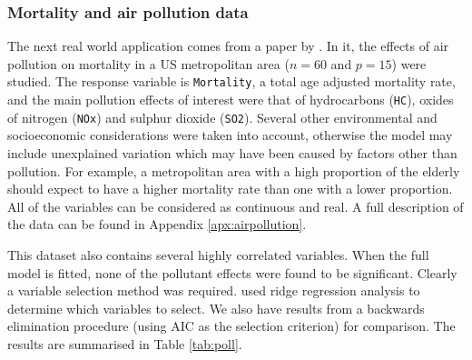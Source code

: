 \subsubsection{Mortality and air pollution data}
\label{sec:airpollution}

The next real world application comes from a paper by \cite{McDonald1973}. In it, the effects of air pollution on mortality in a US metropolitan area ($n=60$ and $p=15$) were studied. The response variable is \texttt{Mortality}, a total age adjusted mortality rate, and the main pollution effects of interest were that of hydrocarbons (\texttt{HC}), oxides of nitrogen (\texttt{NOx}) and sulphur dioxide (\texttt{SO2}). Several other environmental and socioeconomic considerations were taken into account, otherwise the model may include unexplained variation which may have been caused by factors other than pollution. For example, a metropolitan area with a high proportion of the elderly should expect to have a higher mortality rate than one with a lower proportion. All of the variables can be considered as continuous and real. A full description of the data can be found in Appendix \ref{apx:airpollution}. 

This dataset also contains several highly correlated variables. When the full model is fitted, none of the pollutant effects were found to be significant. Clearly a variable selection method was required. \citeauthor{McDonald1973} used ridge regression analysis to determine which variables to select. We also have results from a backwards elimination procedure (using AIC as the selection criterion) for comparison. The results are summarised in Table \ref{tab:poll}.

